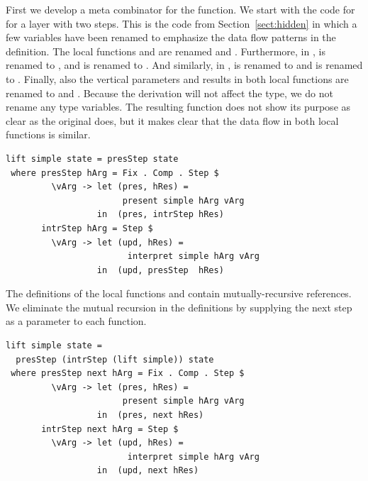 \documentclass[preprint,natbib]{sigplanconf}
\begin{document}
First we develop a meta combinator for the  function. We start with the code for  for a layer with two steps. This is the code from Section~\ref{sect:hidden} in which a few variables have been renamed to emphasize the data flow patterns in the definition.
\bc The local functions  and  are renamed  and . Furthermore, in ,  is renamed to , and  is renamed to . And similarly, in ,  is renamed to  and  is renamed to . Finally, also the vertical parameters and results in both local functions are renamed to  and . Because the derivation will not affect the type, we do not rename any type variables. The resulting function does not show its purpose as clear as the original does, but it makes clear that the data flow in both local functions is similar. \ec


\begin{small} %
\begin{verbatim}
lift simple state = presStep state 
 where presStep hArg = Fix . Comp . Step $
         \vArg -> let (pres, hRes) = 
                       present simple hArg vArg
                  in  (pres, intrStep hRes)
       intrStep hArg = Step $
         \vArg -> let (upd, hRes) = 
                        interpret simple hArg vArg
                  in  (upd, presStep  hRes)
\end{verbatim}
\end{small}

The definitions of the local functions  and  contain mutually-recursive references. We eliminate the mutual recursion in the definitions by supplying the next step as a parameter to each function.

      
      
\begin{small} %
\begin{verbatim}
lift simple state =
  presStep (intrStep (lift simple)) state
 where presStep next hArg = Fix . Comp . Step $
         \vArg -> let (pres, hRes) = 
                       present simple hArg vArg
                  in  (pres, next hRes)
       intrStep next hArg = Step $
         \vArg -> let (upd, hRes) = 
                        interpret simple hArg vArg
                  in  (upd, next hRes)
\end{verbatim}
\end{small}
\end{document}
